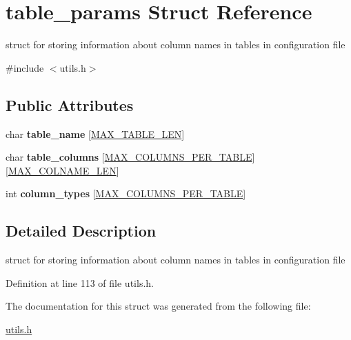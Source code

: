 \hypertarget{structtable__params}{\section{table\-\_\-params Struct Reference}
\label{structtable__params}
}


struct for storing information about column names in tables in configuration file  




{\ttfamily \#include $<$utils.\-h$>$}

\subsection*{Public Attributes}
\begin{DoxyCompactItemize}
\item 
\hypertarget{structtable__params_aabe547eaf717d50b516f03669686fc88}{char {\bfseries table\-\_\-name} \mbox{[}\hyperlink{storage_8h_ae7854bc280576d57ec5c80995d5ea94c}{M\-A\-X\-\_\-\-T\-A\-B\-L\-E\-\_\-\-L\-E\-N}\mbox{]}}\label{structtable__params_aabe547eaf717d50b516f03669686fc88}

\item 
\hypertarget{structtable__params_a3c5a48e042a7be42a6bf4eb9b88057c0}{char {\bfseries table\-\_\-columns} \mbox{[}\hyperlink{storage_8h_a2c806bc7de304d1d07bb12c9d58dbdd1}{M\-A\-X\-\_\-\-C\-O\-L\-U\-M\-N\-S\-\_\-\-P\-E\-R\-\_\-\-T\-A\-B\-L\-E}\mbox{]}\mbox{[}\hyperlink{storage_8h_a5cced553ee7679aebe25952d79c7b86b}{M\-A\-X\-\_\-\-C\-O\-L\-N\-A\-M\-E\-\_\-\-L\-E\-N}\mbox{]}}\label{structtable__params_a3c5a48e042a7be42a6bf4eb9b88057c0}

\item 
\hypertarget{structtable__params_a3efa521b44f4ce077d90362328a722b6}{int {\bfseries column\-\_\-types} \mbox{[}\hyperlink{storage_8h_a2c806bc7de304d1d07bb12c9d58dbdd1}{M\-A\-X\-\_\-\-C\-O\-L\-U\-M\-N\-S\-\_\-\-P\-E\-R\-\_\-\-T\-A\-B\-L\-E}\mbox{]}}\label{structtable__params_a3efa521b44f4ce077d90362328a722b6}

\end{DoxyCompactItemize}


\subsection{Detailed Description}
struct for storing information about column names in tables in configuration file 

Definition at line 113 of file utils.\-h.



The documentation for this struct was generated from the following file\-:\begin{DoxyCompactItemize}
\item 
\hyperlink{utils_8h}{utils.\-h}\end{DoxyCompactItemize}
